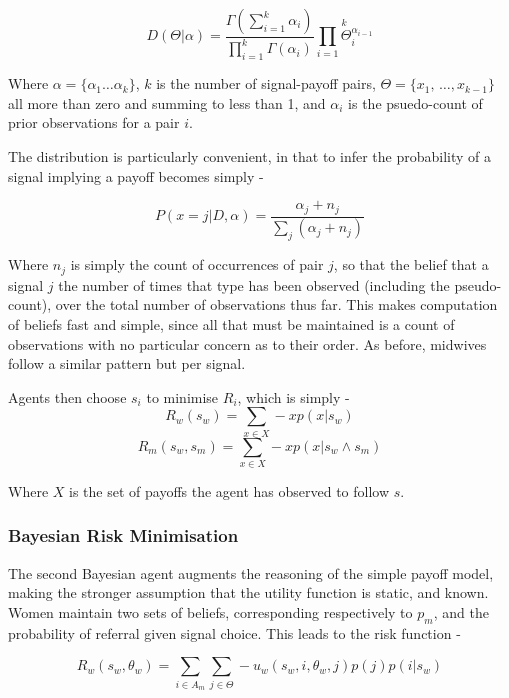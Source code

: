 \[
D(\Theta|\alpha)=\frac{\Gamma(\sum_{i=1}^{k}\alpha_{i})}{\prod_{i=1}^{k}\Gamma(\alpha_{i})}\overset{k}{\underset{i=1}{\prod}\Theta_{i}^{\alpha_{i-1}}}
\]


Where \(\alpha=\{\alpha_{1}\ldots\alpha_{k}\}\), \(k\) is the number
of signal-payoff pairs, \(\Theta=\{x_{1},\,\ldots,x_{k-\text{1}}\}\) all
more than zero and summing to less than 1, and \(\alpha_{i}\) is the 
psuedo-count of prior observations for a pair \(i\). 

The distribution is particularly convenient, in that to infer the
probability of a signal implying a payoff becomes
simply -

\begin{equation}
P(x=j|D,\alpha)=\frac{\alpha_{j}+n_{j}}{\sum_{j}(\alpha_{j}+n_{j})}\label{eq:posterior}
\end{equation}


Where \(n_{j}\) is simply the count of occurrences of pair \(j\), so
that the belief that a signal \(j\) the number
of times that type has been observed (including the pseudo-count),
over the total number of observations thus far. This makes computation
of beliefs fast and simple, since all that must be maintained is
a count of observations with no particular concern as to their order.
As before, midwives follow a similar pattern but per signal.

Agents then choose $s_{i}$ to minimise $R_{i}$, which is simply - 
\begin{equation}
R_{w}(s_{w}) = \sum_{x \in X} -xp(x | s_{w})
\end{equation}
\begin{equation}
R_{m}(s_{w}, s_{m}) = \sum_{x \in X} -xp(x | s_{w}\wedge s_{m})
\end{equation}

Where $X$ is the set of payoffs the agent has observed to follow $s$.

\subsubsection{Bayesian Risk Minimisation}

The second Bayesian agent augments the reasoning of the simple payoff model, making the stronger assumption that the utility function is static, and known. Women maintain two sets of beliefs, corresponding respectively to \(p_{m}\), and the probability of referral given signal choice. This leads to the risk function -

\begin{equation}
R_{w}(s_{w}, \theta_{w}) = \sum_{i\in A_{m}}\sum_{j\in \Theta} -u_{w}(s_{w}, i, \theta_{w}, j)p(j)p(i | s_{w})
\end{equation}

